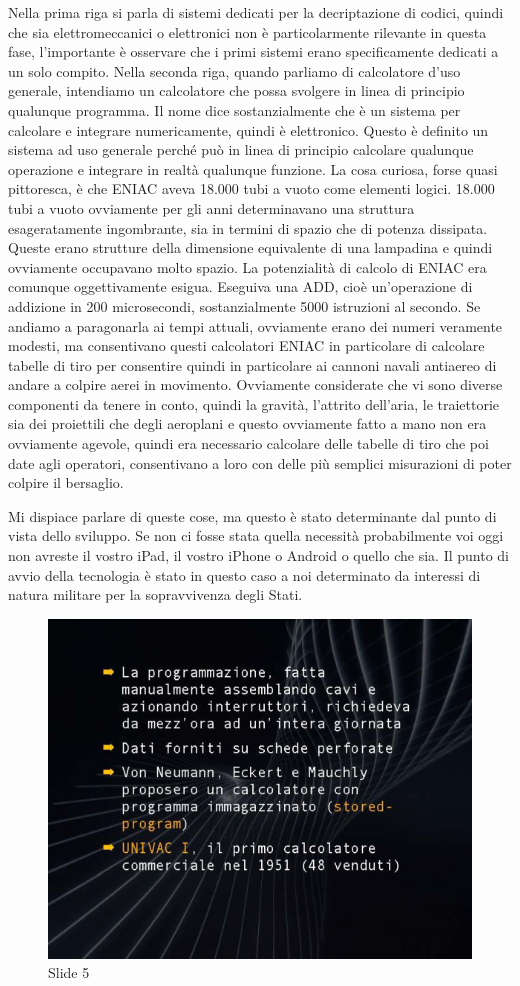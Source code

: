 Nella prima riga si parla di sistemi dedicati per la decriptazione di codici, quindi che sia elettromeccanici o elettronici non è particolarmente rilevante in questa fase, l'importante è osservare che i primi sistemi erano specificamente dedicati a un solo compito.
Nella seconda riga, quando parliamo di calcolatore d'uso generale, intendiamo un calcolatore che possa svolgere in linea di principio qualunque programma.
Il nome dice sostanzialmente che è un sistema per calcolare e integrare numericamente, quindi è elettronico.
Questo è definito un sistema ad uso generale perché può in linea di principio calcolare qualunque operazione e integrare in realtà qualunque funzione.
La cosa curiosa, forse quasi pittoresca, è che ENIAC aveva 18.000 tubi a vuoto come elementi logici.
18.000 tubi a vuoto ovviamente per gli anni determinavano una struttura esageratamente ingombrante, sia in termini di spazio che di potenza dissipata.
Queste erano strutture della dimensione equivalente di una lampadina e quindi ovviamente occupavano molto spazio.
La potenzialità di calcolo di ENIAC era comunque oggettivamente esigua.
Eseguiva una ADD, cioè un'operazione di addizione in 200 microsecondi, sostanzialmente 5000 istruzioni al secondo.
Se andiamo a paragonarla ai tempi attuali, ovviamente erano dei numeri veramente modesti, ma consentivano questi calcolatori ENIAC in particolare di calcolare tabelle di tiro per consentire quindi in particolare ai cannoni navali antiaereo di andare a colpire aerei in movimento.
Ovviamente considerate che vi sono diverse componenti da tenere in conto, quindi la gravità, l'attrito dell'aria, le traiettorie sia dei proiettili che degli aeroplani e questo ovviamente fatto a mano non era ovviamente agevole, quindi era necessario calcolare delle tabelle di tiro che poi date agli operatori, consentivano a loro con delle più semplici misurazioni di poter colpire il bersaglio.

Mi dispiace parlare di queste cose, ma questo è stato determinante dal punto di vista dello sviluppo.
Se non ci fosse stata quella necessità probabilmente voi oggi non avreste il vostro iPad, il vostro iPhone o Android o quello che sia.
Il punto di avvio della tecnologia è stato in questo caso a noi determinato da interessi di natura militare per la sopravvivenza degli Stati.

\begin{figure}[ht]
    \centering
    \includegraphics[width=0.6\linewidth]{images/Lez01_p01_fig_05.png}
    \caption{Slide 5}
    \label{fig:slide_5}
\end{figure}

